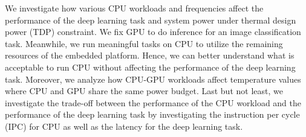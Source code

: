We investigate how various CPU workloads and frequencies affect the performance of the deep learning task and system power under thermal design power (TDP) constraint. We fix GPU to do inference for an image classification task. Meanwhile, we run meaningful tasks on CPU to utilize the remaining resources of the embedded platform. Hence, we can better understand what is acceptable to run CPU without affecting the performance of the deep learning task. Moreover, we analyze how CPU-GPU workloads affect temperature values where CPU and GPU share the same power budget. Last but not least, we investigate the trade-off between the performance of the CPU workload and the performance of the deep learning task by investigating the instruction per cycle (IPC) for CPU as well as the latency for the deep learning task.